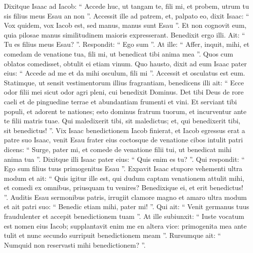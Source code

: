 \begin{biblechapter}
\begin{biblechapter}
\begin{biblechapter}
\begin{biblechapter}
\begin{biblechapter}
\begin{biblechapter}
\begin{biblechapter}
\begin{biblechapter}
\begin{biblechapter}
\begin{biblechapter}
\begin{biblechapter}
\begin{biblechapter}
\begin{biblechapter}
\begin{biblechapter}
\begin{biblechapter}
\begin{biblechapter}
\begin{biblechapter}
\begin{biblechapter}
\begin{biblechapter}
\begin{biblechapter}
\begin{biblechapter}
\begin{biblechapter}
\begin{biblechapter}
\begin{biblechapter}
\begin{biblechapter}
\begin{biblechapter}
\begin{biblechapter}
 \verse Dixitque Isaac ad Iacob: “ Accede huc, ut tangam te, fili mi, et probem, utrum tu sis filius meus Esau an non ”. 
\verse Accessit ille ad patrem, et, palpato eo, dixit Isaac: “ Vox quidem, vox Iacob est, sed manus, manus sunt Esau ”. 
\verse Et non cognovit eum, quia pilosae manus similitudinem maioris expresserant. Benedixit ergo illi. 
\verse Ait: “ Tu es filius meus Esau? ”. Respondit: “ Ego sum ”.
 \verse At ille: “ Affer, inquit, mihi, et comedam de venatione tua, fili mi, ut benedicat tibi anima mea ”. Quos cum oblatos comedisset, obtulit ei etiam vinum. Quo hausto, 
\verse dixit ad eum Isaac pater eius: “ Accede ad me et da mihi osculum, fili mi ”. 
\verse Accessit et osculatus est eum. Statimque, ut sensit vestimentorum illius fragrantiam, benedicens illi ait:
 “ Ecce odor filii mei
 sicut odor agri pleni,
 cui benedixit Dominus.
 \verse Det tibi Deus de rore caeli
 et de pinguedine terrae
 et abundantiam frumenti et vini.
 \verse Et serviant tibi populi,
 et adorent te nationes;
 esto dominus fratrum tuorum,
 et incurventur ante te filii matris tuae.
 Qui maledixerit tibi, sit maledictus;
 et, qui benedixerit tibi, sit benedictus! ”.
 \verse Vix Isaac benedictionem Iacob finierat, et Iacob egressus erat a patre suo Isaac, venit Esau frater eius 
\verse coctosque de venatione cibos intulit patri dicens: “ Surge, pater mi, et comede de venatione filii tui, ut benedicat mihi anima tua ”. 
\verse Dixitque illi Isaac pater eius: “ Quis enim es tu? ”. Qui respondit: “ Ego sum filius tuus primogenitus Esau ”. 
\verse Expavit Isaac stupore vehementi ultra modum et ait: “ Quis igitur ille est, qui dudum captam venationem attulit mihi, et comedi ex omnibus, priusquam tu venires? Benedixique ei, et erit benedictus! ”.
 \verse Auditis Esau sermonibus patris, irrugiit clamore magno et amaro ultra modum et ait patri suo: “ Benedic etiam mihi, pater mi! ”. 
\verse Qui ait: “ Venit germanus tuus fraudulenter et accepit benedictionem tuam ”. 
\verse At ille subiunxit: “ Iuste vocatum est nomen eius Iacob; supplantavit enim me en altera vice: primogenita mea ante tulit et nunc secundo surripuit benedictionem meam ”.
 Rursumque ait: “ Numquid non reservasti mihi benedictionem? ”. 

\end{biblechapter}
\end{biblechapter}
\end{biblechapter}
\end{biblechapter}
\end{biblechapter}
\end{biblechapter}
\end{biblechapter}
\end{biblechapter}
\end{biblechapter}
\end{biblechapter}
\end{biblechapter}
\end{biblechapter}
\end{biblechapter}
\end{biblechapter}
\end{biblechapter}
\end{biblechapter}
\end{biblechapter}
\end{biblechapter}
\end{biblechapter}
\end{biblechapter}
\end{biblechapter}
\end{biblechapter}
\end{biblechapter}
\end{biblechapter}
\end{biblechapter}
\end{biblechapter}
\end{biblechapter}
